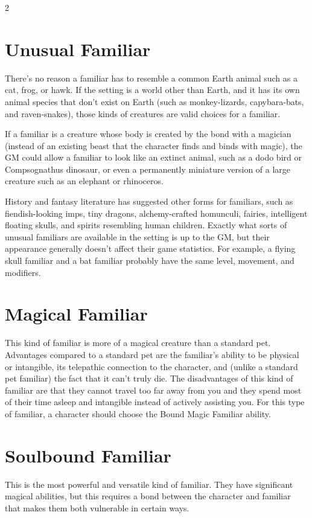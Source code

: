 \begin{multicols}{2}
\section{Unusual Familiar}

There’s no reason a familiar has to resemble a common Earth animal such as a cat, frog, or hawk. If the setting is a world other than Earth, and it has its own animal species that don’t exist on Earth (such as monkey-lizards, capybara-bats, and raven‑snakes), those kinds of creatures are valid choices for a familiar. 

If a familiar is a creature whose body is created by the bond with a magician (instead of an existing beast that the character finds and binds with magic), the GM could allow a familiar to look like an extinct animal, such as a dodo bird or Compsognathus dinosaur, or even a permanently miniature version of a large creature such as an elephant or rhinoceros. 

History and fantasy literature has suggested other forms for familiars, such as fiendish-looking imps, tiny dragons, alchemy-crafted homunculi, fairies, intelligent floating skulls, and spirits resembling human children. Exactly what sorts of unusual familiars are available in the setting is up to the GM, but their appearance generally doesn’t affect their game statistics. For example, a flying skull familiar and a bat familiar probably have the same level, movement, and modifiers.

\section{Magical Familiar}

This kind of familiar is more of a magical creature than a standard pet. Advantages compared to a standard pet are the familiar’s ability to be physical or intangible, its telepathic connection to the character, and (unlike a standard pet familiar) the fact that it can’t truly die. The disadvantages of this kind of familiar are that they cannot travel too far away from you and they spend most of their time asleep and intangible instead of actively assisting you. For this type of familiar, a character should choose the Bound Magic Familiar ability.

\section{Soulbound Familiar}

This is the most powerful and versatile kind of familiar. They have significant magical abilities, but this requires a bond between the character and familiar that makes them both vulnerable in certain ways. 


\end{multicols}
